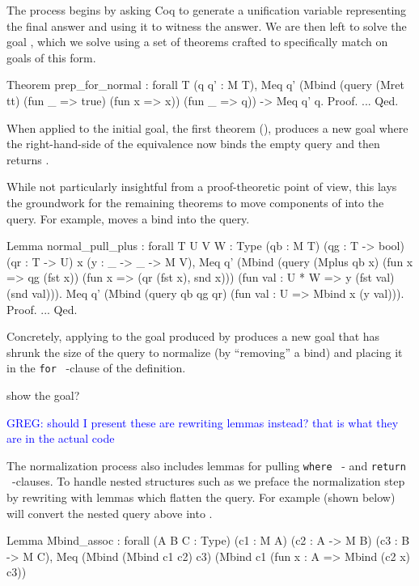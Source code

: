 \documentclass[preprint]{sigplanconf}
\newcommand{\FOR}{{\tt for} \ }
\newcommand{\WHERE}{{\tt where} \ }
\newcommand{\RETURN}{{\tt return} \ }
\newcommand{\greg}[1]{\textcolor{blue}{GREG: #1}}
\begin{document}
The process begins by asking Coq to generate a unification variable representing the final answer and using it to witness the answer.
We are then left to solve the goal , which we solve using a set of theorems crafted to specifically match on goals of this form.
\begin{coq}
Theorem prep_for_normal : forall {T} (q q' : M T),
  Meq q' (Mbind (query (Mret tt) (fun _ => true) (fun x => x))
                       (fun _ => q)) ->
  Meq q' q.
Proof. ... Qed.
\end{coq}
When applied to the initial goal, the first theorem (), produces a new goal where the right-hand-side of the equivalence now binds the empty query and then returns .

While not particularly insightful from a proof-theoretic point of view, this lays the groundwork for the remaining theorems to move components of  into the query.
For example,  moves a bind into the query.
\begin{coq}
Lemma normal_pull_plus
: forall {T U V W : Type} (qb : M T) (qg : T -> bool) (qr : T -> U) x (y : _ -> _ -> M V),
  Meq q'
      (Mbind (query (Mplus qb x) (fun x => qg (fst x)) (fun x => (qr (fst x), snd x)))
             (fun val : U * W => y (fst val) (snd val))).
  Meq q'
      (Mbind (query qb qg qr)
             (fun val : U => Mbind x (y val))).
Proof. ... Qed.
\end{coq}
Concretely, applying  to the goal produced by  produces a new goal that has shrunk the size of the query to normalize (by ``removing'' a bind) and placing it in the \FOR-clause of the  definition.
\begin{coq}
show the goal?
\end{coq}
\greg{should I present these are rewriting lemmas instead? that is what they are in the actual code}

The normalization process also includes lemmas for pulling \WHERE- and \RETURN-clauses.
To handle nested structures such as  we preface the normalization step by rewriting with lemmas which flatten the query.
For example  (shown below) will convert the nested query above into .
\begin{coq}
Lemma Mbind_assoc
: forall (A B C : Type) (c1 : M A) (c2 : A -> M B)
         (c3 : B -> M C),
  Meq (Mbind (Mbind c1 c2) c3)
      (Mbind c1 (fun x : A => Mbind (c2 x) c3))
\end{coq}
\end{document}
